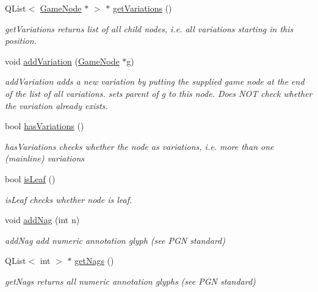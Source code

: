 \begin{DoxyCompactItemize}
Q\-List$<$ \hyperlink{classchess_1_1GameNode}{Game\-Node} $\ast$ $>$ $\ast$ \hyperlink{classchess_1_1GameNode_a901705a202fb5d5b7795e9c49e1f003c}{get\-Variations} ()
\begin{DoxyCompactList}\small\item\em get\-Variations returns list of all child nodes, i.\-e. all variations starting in this position. \end{DoxyCompactList}\item 
void \hyperlink{classchess_1_1GameNode_a79a49a66ec0ad97dfa1f86af3135c1b4}{add\-Variation} (\hyperlink{classchess_1_1GameNode}{Game\-Node} $\ast$g)
\begin{DoxyCompactList}\small\item\em add\-Variation adds a new variation by putting the supplied game node at the end of the list of all variations. sets parent of g to this node. Does N\-O\-T check whether the variation already exists. \end{DoxyCompactList}\item 
bool \hyperlink{classchess_1_1GameNode_a53453fb45ecf163d4b7c09d7f7d7166d}{has\-Variations} ()
\begin{DoxyCompactList}\small\item\em has\-Variations checks whether the node as variations, i.\-e. more than one (mainline) variations \end{DoxyCompactList}\item 
bool \hyperlink{classchess_1_1GameNode_a727d2e54a5c38bb082e356f254e15400}{is\-Leaf} ()
\begin{DoxyCompactList}\small\item\em is\-Leaf checks whether node is leaf. \end{DoxyCompactList}\item 
void \hyperlink{classchess_1_1GameNode_aa2e6bfdf0cedd649fd643b8d27be885a}{add\-Nag} (int n)
\begin{DoxyCompactList}\small\item\em add\-Nag add numeric annotation glyph (see P\-G\-N standard) \end{DoxyCompactList}\item 
Q\-List$<$ int $>$ $\ast$ \hyperlink{classchess_1_1GameNode_a7a96e223a5f25429e001646d51404704}{get\-Nags} ()
\begin{DoxyCompactList}\small\item\em get\-Nags returns all numeric annotation glyphs (see P\-G\-N standard) \end{DoxyCompactList}\item 

\end{DoxyCompactItemize}
